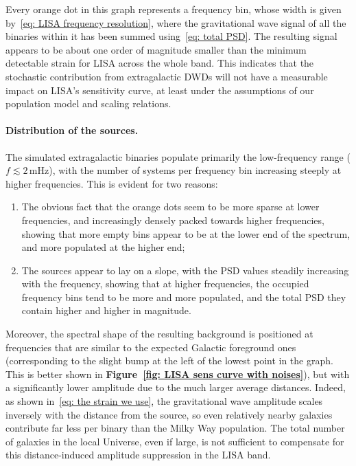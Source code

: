 Every orange dot in this graph represents a frequency bin, whose width is given by~\eqref{eq: LISA frequency resolution}, where the gravitational wave signal of all the binaries within it has been summed using~\eqref{eq: total PSD}.
The resulting signal appears to be about one order of magnitude smaller than the minimum detectable strain for LISA across the whole band.  
This indicates that the stochastic contribution from extragalactic DWDs will not have a measurable impact on LISA’s sensitivity curve, at least under the assumptions of our population model and scaling relations.

\paragraph{Distribution of the sources.}
The simulated extragalactic binaries populate primarily the low-frequency range ($f \lesssim 2\,\mathrm{mHz}$), with the number of systems per frequency bin increasing steeply at higher frequencies. 
This is evident for two reasons:
\begin{enumerate}
    \item The obvious fact that the orange dots seem to be more sparse at lower frequencies, and increasingly densely packed towards higher frequencies, showing that more empty bins appear to be at the lower end of the spectrum, and more populated at the higher end;
    \item The sources appear to lay on a slope, with the PSD values steadily increasing with the frequency, showing that at higher frequencies, the occupied frequency bins tend to be more and more populated, and the total PSD they contain higher and higher in magnitude.
\end{enumerate}
Moreover, the spectral shape of the resulting background is positioned at frequencies that are similar to the expected Galactic foreground ones (corresponding to the slight bump at the left of the lowest point in the graph. 
This is better shown in \textbf{Figure~\ref{fig: LISA sens curve with noises}}), but with a significantly lower amplitude due to the much larger average distances.
Indeed, as shown in~\eqref{eq: the strain we use}, the gravitational wave amplitude scales inversely with the distance from the source, so even relatively nearby galaxies contribute far less per binary than the Milky Way population. 
The total number of galaxies in the local Universe, even if large, is not sufficient to compensate for this distance-induced amplitude suppression in the LISA band.
